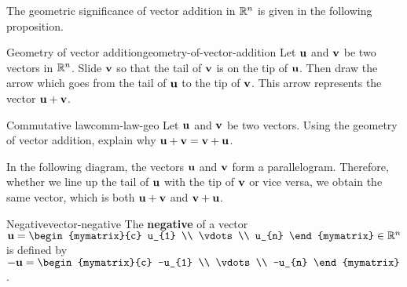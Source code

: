The geometric significance of vector addition in $\mathbb{R}^n$ is given in
the following proposition.

\begin{proposition}{Geometry of vector addition}{geometry-of-vector-addition}
  Let $\mbox{\bf u}$ and $\mbox{\bf v}$ be two vectors in $\mathbb{R}^n$. Slide
  $\mbox{\bf v}$ so that the tail of $\mbox{\bf v}$ is on the tip of
  $\mbox{\bf u}$. Then draw the arrow which goes from the tail of
  $\mbox{\bf u}$ to the tip of $\mbox{\bf v}$.  This arrow represents the
  vector $\mbox{\bf u}+\mbox{\bf v}$.

  \begin{center}
  \end{center}
\end{proposition}

\begin{example}{Commutative law}{comm-law-geo}
  Let $\mbox{\bf u}$ and $\mbox{\bf v}$ be two vectors. Using the geometry of
  vector addition, explain why $\mbox{\bf u}+\mbox{\bf v} = \mbox{\bf v} + \mbox{\bf u}$.
\end{example}

\begin{solution}
  In the following diagram, the vectors $\mbox{\bf u}$ and $\mbox{\bf v}$ form
  a parallelogram. Therefore, whether we line up the tail of
  $\mbox{\bf u}$ with the tip of $\mbox{\bf v}$ or vice versa, we obtain the
  same vector, which is both $\mbox{\bf u}+\mbox{\bf v}$ and
  $\mbox{\bf v}+\mbox{\bf u}$.
\begin{center}
\end{center}
\end{solution}

\begin{definition}{Negative}{vector-negative}
  The \textbf{negative} of a vector
  $\vect{u}=\begin{mymatrix}{c}
    u_{1} \\
    \vdots \\
    u_{n}
  \end{mymatrix}\in\R^{n}$ is defined by 
  $-\vect{u} = \begin{mymatrix}{c}
    -u_{1} \\
    \vdots \\
    -u_{n}
  \end{mymatrix}$.
\end{definition}

